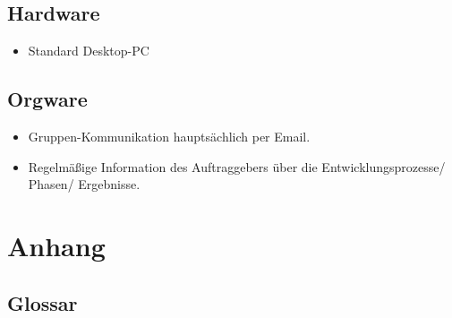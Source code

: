 \documentclass[10pt]{scrreprt}
\begin{document}
\section{Hardware}
\begin{itemize}
\item Standard Desktop-PC
\end{itemize}

\section{Orgware}
\begin{itemize}
\item Gruppen-Kommunikation hauptsächlich per Email.
\item Regelmäßige Information des Auftraggebers über die Entwicklungsprozesse/ Phasen/ Ergebnisse.
\end{itemize}




\chapter{Anhang}
\section{Glossar}
\end{document}
